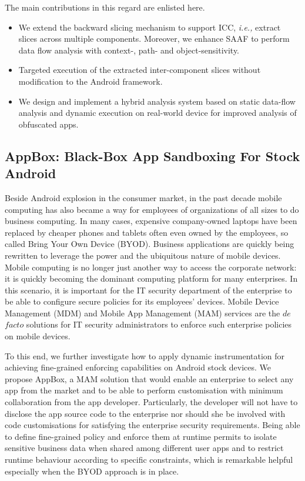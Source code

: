 The main contributions in this regard are enlisted here.

\begin{itemize}
\item We extend the backward slicing mechanism to support ICC, \textit{i.e.,} extract slices across multiple components. Moreover, we enhance SAAF to perform data flow analysis with context-, path- and  object-sensitivity.

\item Targeted execution of the extracted inter-component slices without modification to the Android framework.

\item We design and implement a hybrid analysis system based on static data-flow analysis and dynamic execution on real-world device for improved analysis of obfuscated apps.
\end{itemize}

\subsection{AppBox: Black-Box App Sandboxing For Stock Android}

Beside Android explosion in the consumer market, in the past decade mobile computing has also became a way for employees of organizations of all sizes to do business computing.  In many cases, expensive company-owned laptops have been replaced by cheaper phones and tablets often even owned by the employees, so called Bring Your Own Device (BYOD). Business applications are quickly being rewritten to leverage the power and the ubiquitous nature of mobile devices. Mobile computing is no longer just another way to access the corporate network: it is quickly becoming the dominant computing platform for many enterprises. In this scenario, it is important for the IT security department of the enterprise to be able to configure secure policies for its employees' devices. Mobile Device Management (MDM) and Mobile App Management (MAM) services are the $de$ $facto$ solutions for IT security administrators to enforce such enterprise policies on mobile devices.

To this end, we further investigate how to apply dynamic instrumentation for achieving fine-grained enforcing capabilities on Android stock devices. We propose AppBox, a MAM solution that would enable an enterprise to select any app from the market and to be able to perform customisation with minimum collaboration from the app developer. Particularly, the developer will not have to disclose the app source code to the enterprise nor should she be involved with code customisations for satisfying the enterprise security requirements. Being able to define fine-grained policy and enforce them at runtime permits to isolate sensitive business data when shared among different user apps and to restrict runtime behaviour according to specific constraints, which is remarkable helpful especially when the BYOD approach is in place. 

